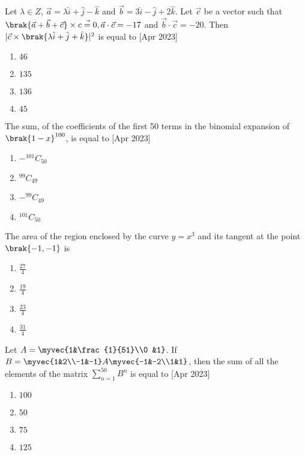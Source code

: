 \item Let $\lambda \in Z$, $\vec{a}=\lambda \hat{i}+\hat{j}-\hat{k}$ and $\vec{b}=3\hat{i}-\hat{j}+2\hat{k}$. Let $\vec{c}$ be a vector such that $\brak{\vec{a}+\vec{b}+\vec{c}}\times \vec{c=0},\vec{a}\cdot \vec{c}=-17$ and $\vec{b}\cdot \vec{c}=-20$. Then $|\vec{c}\times \brak{\lambda \hat{i}+\hat{j}+\hat{k}}|^2$ is equal to \hfill[Apr 2023]
\begin{multicols}{2}
\begin{enumerate}
         \item $46$
       \item $135$
       \item $136$
       \item $45$
\end{enumerate}
\end{multicols}

\item The sum, of the coefficients of the first 50 terms in the binomial expansion of $\brak{1-x}^{100}$, is equal to \hfill[Apr 2023]
\begin{multicols}{2}
\begin{enumerate}
    \item $-^{101}C_{50}$
    \item $^{99}C_{49}$
    \item $-^{99}C_{49}$
    \item $^{101}C_{50}$
\end{enumerate}
\end{multicols}

\item The area of the region enclosed by the curve $y=x^3$ and its tangent at the point $\brak{-1,-1}$ is
\begin{multicols}{2}
\begin{enumerate}
    \item $\frac{27}{4}$
    \item $\frac{19}{4}$
    \item $\frac{23}{4}$
    \item $\frac{31}{4}$
\end{enumerate}
\end{multicols}

\item Let $A=\myvec{1&\frac{1}{51}\\0 &1}$. If $B=\myvec{1&2\\-1&-1}A\myvec{-1&-2\\1&1}$, then the sum of all the elements of the matrix $\sum_{n=1}^{50}B^n$ is equal to \hfill[Apr 2023]
\begin{multicols}{2}
\begin{enumerate}
       \item $100$
       \item $50$
       \item $75$
       \item $125$
\end{enumerate}
\end{multicols}

